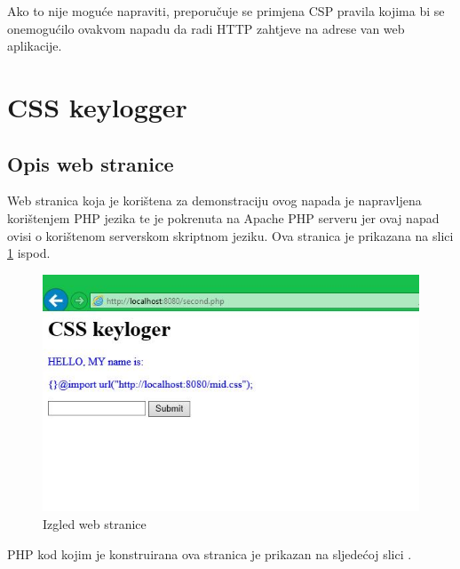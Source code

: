 \documentclass[12pt, oneside, onecolumn]{book}
\begin{document}
{Ako to nije moguće napraviti, preporučuje se primjena CSP pravila kojima bi se onemogućilo ovakvom napadu da radi HTTP zahtjeve na adrese van web aplikacije.

\section{CSS keylogger}
\subsection{Opis web stranice}
Web stranica koja je korištena za demonstraciju ovog napada je napravljena korištenjem PHP jezika te je pokrenuta na Apache PHP serveru jer ovaj napad ovisi o korištenom serverskom skriptnom jeziku. Ova stranica je prikazana na slici \ref{fig:css} ispod.

\begin{figure}[H]
	\begin{center}
		\includegraphics[width=\textwidth]{css.jpg}
		\caption{Izgled web stranice} \label{fig:css}
	\end{center}
\end{figure}

PHP kod kojim je konstruirana ova stranica je prikazan na sljedećoj slici .

}
\end{document}
